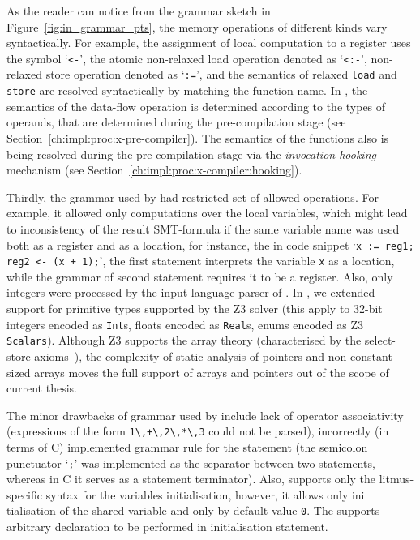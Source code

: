 As the reader can notice from the grammar sketch in Figure~\ref{fig:in_grammar_pts}, the memory operations of different kinds vary syntactically.
For example, the assignment of local computation to a register uses the symbol `\lstinline{<-}', the atomic non-relaxed load operation denoted as `\lstinline{<:-}', non-relaxed store operation denoted as `\lstinline{:=}', and the semantics of relaxed \lstinline{load} and \lstinline{store} are resolved syntactically by matching the function name.
In \porthos[2], the semantics of the data-flow operation is determined according to the types of operands, that are determined during the pre-compilation stage (see Section~\ref{ch:impl:proc:x-pre-compiler}).
The semantics of the functions also is being resolved during the pre-compilation stage via the \textit{invocation hooking} mechanism (see Section~\ref{ch:impl:proc:x-compiler:hooking}).

Thirdly, the grammar used by \porthos{} had restricted set of allowed operations. For example, it allowed only computations over the local variables, which might lead to inconsistency of the result SMT-formula if the same variable name was used both as a register and as a location, for instance, the in code snippet `\lstinline{x := reg1; reg2 <- (x + 1);}', the first statement interprets the variable \lstinline{x} as a location, while the grammar of second statement requires it to be a register. Also, only integers were processed by the input language parser of \porthos[1]. In \porthos[2], we extended support for primitive types supported by the Z3 solver (this apply to 32-bit integers encoded as \texttt{Int}s, floats encoded as \texttt{Real}s, enums encoded as Z3 \texttt{Scalars}).
Although Z3 supports the array theory (characterised by the select-store axioms~\cite{de2011z3}), the complexity of static analysis of pointers and non-constant sized arrays moves the full support of arrays and pointers out of the scope of current thesis.

The minor drawbacks of grammar used by \porthos[1] include lack of operator associativity (expressions of the form \lstinline{1\,+\,2\,*\,3} could not be parsed), incorrectly (in terms of C) implemented grammar rule for the statement (the semicolon punctuator `\lstinline{;}' was implemented as the separator between two statements, whereas in C it serves as a statement terminator). Also, \porthos[1] supports only the litmus-specific syntax for the variables initialisation, however, it allows only ini
tialisation of the shared variable and only by default value \lstinline{0}. The \porthos[2] supports arbitrary declaration to be performed in initialisation statement.


